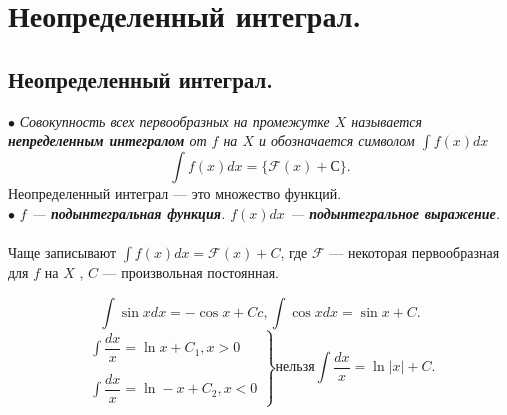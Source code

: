 \chapter{Неопределенный интеграл.}
\section{Неопределенный интеграл.}
$\bullet$ \textit{Совокупность всех первообразных на промежутке $X$ называется \textbf{непределенным интегралом} от $f$ на $X$ и обозначается символом $\int f(x)dx$}
$$\int f(x)dx = \{\mathcal{F}(x) + С\}.$$
Неопределенный интеграл --- это множество функций.\\
$\bullet$ \textit{$f$ --- \textbf{подынтегральная функция}. $f(x)dx$ --- \textbf{подынтегральное выражение}.}\\\\
Чаще записывают $\int f(x)dx = \mathcal{F}(x) + C$, где $\mathcal{F}$ --- некоторая первообразная для $f$ на $X$ , $C$ --- произвольная постоянная.\\
\begin{example}
	$$\int \sin xdx = - \cos x +Cc, \int \cos xdx = \sin x + C.$$
	$$\left.\begin{gathered}
		\int \dfrac{dx}{x} = \ln x + C_1, x > 0\\\\
		\int \dfrac{dx}{x} = \ln -x + C_2, x < 0
	\end{gathered}\right\}
	\text{нельзя} \int \frac{dx}{x} = \ln |x| + C.$$
\end{example}
